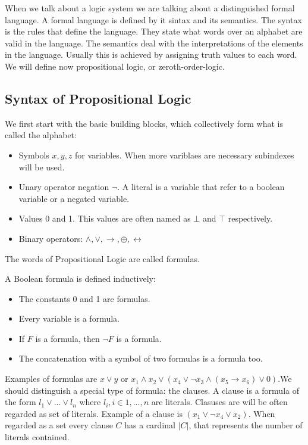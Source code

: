 \begin{definition}
When we talk about a logic system we are talking about a distinguished formal language. A formal language is defined by it sintax and its semantics. The syntax is the rules that define the language. They state what words over an alphabet are valid in the language. The semantics deal with the interpretations of the elements in the language. Usually this is achieved by assigning truth values to each word.\\

We will define now propositional logic, or zeroth-order-logic. 

\subsection{Syntax of Propositional Logic}
  We first start with the basic building blocks, which collectively form what is called the alphabet:
    \begin{itemize}
    \item Symbols $x,y,z$ for variables. When more variblaes are necessary subindexes will be used.
    \item Unary operator negation $\neg$. A literal is a variable that refer to a boolean variable or a negated variable.
    
    \item Values 0 and 1. This values are often named as $\bot$ and $\top$ respectively.

    \item Binary operators: $\wedge, \vee, \rightarrow, \oplus, \leftrightarrow $
    \end{itemize}


 The words of Propositional Logic are called formulas.
    \begin{definition}
    A Boolean formula is defined inductively:
\begin{itemize}
\item The constants 0 and 1 are formulas.
\item Every variable is a formula.
\item If $F$ is a formula, then $\neg  F$ is a formula.
\item The concatenation with a symbol of two formulas is a formula too.\\
\end{itemize}
\end{definition}

 Examples of formulas are $x\vee y$ or $x_1\wedge x_2 \vee  ( x_4 \vee \neg  x_3 \wedge (x_5\to x_6) \vee 0 )$.We should distinguish a special type of formula: the clauses. A clause  is a formula of the form $l_1\vee ... \vee l_n$ where $l_i, i \in 1,...,n$ are literals. Clasuses are will be often regarded as set of literals. Example of a clause is $(x_1\vee \neg x_4 \vee x_2)$. When regarded as a set every clause $C$ has a cardinal $|C|$, that represents the number of literals contained. \\


\end{definition}
